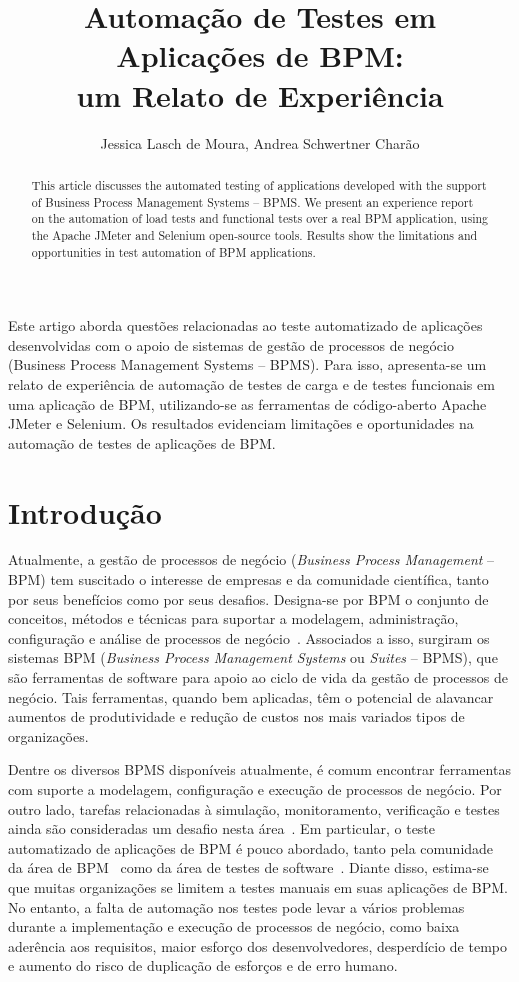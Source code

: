 \documentclass[12pt]{article}
\title{Automação de Testes em Aplicações de BPM:\\ um Relato de Experiência}
\author{Jessica Lasch de Moura\inst{1},
Andrea Schwertner Charão\inst{1}}
\begin{document}
\maketitle

\begin{resumo}
Este artigo aborda questões relacionadas ao teste automatizado de aplicações desenvolvidas com o apoio de sistemas de gestão de processos de negócio (Business Process Management Systems -- BPMS). Para isso, apresenta-se um relato de experiência de automação de testes de carga e de testes funcionais em uma aplicação de BPM, utilizando-se as ferramentas de código-aberto Apache JMeter e Selenium. Os resultados evidenciam limitações e oportunidades na automação de testes de aplicações de BPM.
\end{resumo}

\begin{abstract}
This article discusses the automated testing of applications developed with the support of Business Process Management Systems -- BPMS. We present an experience report on the automation of load tests and functional tests over a real BPM application, using the Apache JMeter and Selenium open-source tools. Results show the limitations and opportunities in test automation of BPM applications.
\end{abstract}

\section{Introdução}

Atualmente, a gestão de processos de negócio (\emph{Business Process Management} -- BPM) tem suscitado o interesse de empresas e da comunidade científica, tanto por seus benefícios como por seus desafios. Designa-se por BPM o conjunto de conceitos, métodos e técnicas para suportar a modelagem, administração, configuração e análise de processos de negócio~\cite{weske, aalst2013survey}. Associados a isso, surgiram os sistemas BPM (\emph{Business Process Management Systems} ou \emph{Suites} -- BPMS), que são ferramentas de software para apoio ao ciclo de vida da gestão de processos de negócio. Tais ferramentas, quando bem aplicadas, têm o potencial de alavancar aumentos de produtividade e redução de custos nos mais variados tipos de organizações. 

Dentre os diversos BPMS disponíveis atualmente, é comum encontrar ferramentas com suporte a modelagem, configuração e execução de processos de negócio. Por outro lado, tarefas relacionadas à simulação, monitoramento, verificação e testes ainda são consideradas um desafio nesta área~\cite{aalst2013survey}. Em particular, o teste automatizado de aplicações de BPM é pouco abordado, tanto pela comunidade da área de BPM~\cite{aalst2013survey} como da área de testes de software~\cite{graham2012experiences}. Diante disso, estima-se que muitas organizações se limitem a testes manuais em suas aplicações de BPM. No entanto, a falta de automação nos testes pode levar a vários problemas durante a implementação e execução de processos de negócio, como baixa aderência aos requisitos, maior esforço dos desenvolvedores, desperdício de tempo e aumento do risco de duplicação de esforços e de erro humano. 
\end{document}
